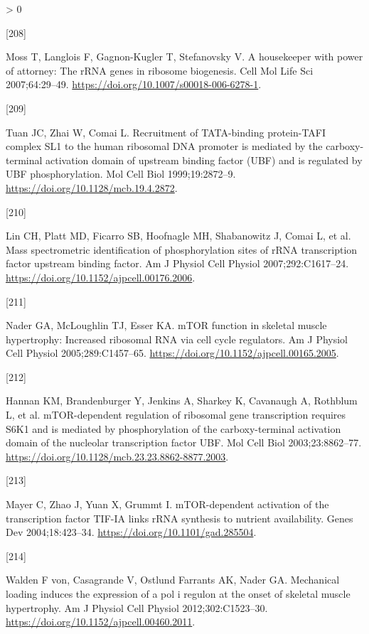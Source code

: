 \documentclass[twoside,10pt]{gihclass} %
\newlength{\cslhangindent}
\newlength{\csllabelwidth}
\newenvironment{CSLReferences}[3] %
 {%
  \setlength{\parindent}{0pt}
  \ifodd #1 \everypar{\setlength{\hangindent}{\cslhangindent}}\ignorespaces\fi
  \ifnum #2 > 0
  \setlength{\parskip}{#2\baselineskip}
  \fi
 }%
 {}
\newcommand{\CSLLeftMargin}[1]{\parbox[t]{\maxof{\widthof{#1}}{\csllabelwidth}}{#1}}
\newcommand{\CSLRightInline}[1]{\parbox[t]{\linewidth}{#1}}
\begin{document}
\begin{CSLReferences}{0}{0}
\leavevmode\hypertarget{ref-RN1820}{}%
\CSLLeftMargin{{[}208{]} }
\CSLRightInline{Moss T, Langlois F, Gagnon-Kugler T, Stefanovsky V. A housekeeper with power of attorney: The rRNA genes in ribosome biogenesis. Cell Mol Life Sci 2007;64:29--49. \url{https://doi.org/10.1007/s00018-006-6278-1}.}

\leavevmode\hypertarget{ref-RN2582}{}%
\CSLLeftMargin{{[}209{]} }
\CSLRightInline{Tuan JC, Zhai W, Comai L. Recruitment of TATA-binding protein-TAFI complex SL1 to the human ribosomal DNA promoter is mediated by the carboxy-terminal activation domain of upstream binding factor (UBF) and is regulated by UBF phosphorylation. Mol Cell Biol 1999;19:2872--9. \url{https://doi.org/10.1128/mcb.19.4.2872}.}

\leavevmode\hypertarget{ref-RN2563}{}%
\CSLLeftMargin{{[}210{]} }
\CSLRightInline{Lin CH, Platt MD, Ficarro SB, Hoofnagle MH, Shabanowitz J, Comai L, et al. Mass spectrometric identification of phosphorylation sites of rRNA transcription factor upstream binding factor. Am J Physiol Cell Physiol 2007;292:C1617--24. \url{https://doi.org/10.1152/ajpcell.00176.2006}.}

\leavevmode\hypertarget{ref-RN1632}{}%
\CSLLeftMargin{{[}211{]} }
\CSLRightInline{Nader GA, McLoughlin TJ, Esser KA. mTOR function in skeletal muscle hypertrophy: Increased ribosomal RNA via cell cycle regulators. Am J Physiol Cell Physiol 2005;289:C1457--65. \url{https://doi.org/10.1152/ajpcell.00165.2005}.}

\leavevmode\hypertarget{ref-RN2564}{}%
\CSLLeftMargin{{[}212{]} }
\CSLRightInline{Hannan KM, Brandenburger Y, Jenkins A, Sharkey K, Cavanaugh A, Rothblum L, et al. mTOR-dependent regulation of ribosomal gene transcription requires S6K1 and is mediated by phosphorylation of the carboxy-terminal activation domain of the nucleolar transcription factor UBF. Mol Cell Biol 2003;23:8862--77. \url{https://doi.org/10.1128/mcb.23.23.8862-8877.2003}.}

\leavevmode\hypertarget{ref-RN2851}{}%
\CSLLeftMargin{{[}213{]} }
\CSLRightInline{Mayer C, Zhao J, Yuan X, Grummt I. mTOR-dependent activation of the transcription factor TIF-IA links rRNA synthesis to nutrient availability. Genes Dev 2004;18:423--34. \url{https://doi.org/10.1101/gad.285504}.}

\leavevmode\hypertarget{ref-RN1828}{}%
\CSLLeftMargin{{[}214{]} }
\CSLRightInline{Walden F von, Casagrande V, Ostlund Farrants AK, Nader GA. Mechanical loading induces the expression of a pol i regulon at the onset of skeletal muscle hypertrophy. Am J Physiol Cell Physiol 2012;302:C1523--30. \url{https://doi.org/10.1152/ajpcell.00460.2011}.}


\end{CSLReferences}
\end{document}
